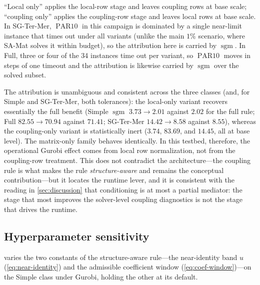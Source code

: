 \documentclass[AMA,Times1COL]{WileyNJDv5} %
\newcommand{\methodMat}{SA-Mat}
\newcommand{\sgm}{\ensuremath{\operatorname{sgm}}}
\newcommand{\PARten}{\ensuremath{\operatorname{PAR10}}}
\providecommand{\DIFadd}[1]{{\protect\color{blue} \sf #1}} %
\begin{document}
\begin{table}[t]
\begin{threeparttable}
\begin{tablenotes}[flushleft]\footnotesize
\item ``Local only'' applies the local-row stage and leaves coupling rows at base scale;
``coupling only'' applies the coupling-row stage and leaves local rows at base scale. In
SG-Ter-Mer, \PARten{} in this campaign is dominated by a single near-limit instance that
times out under all variants (unlike the main $1\%$ scenario, where \methodMat{} solves it
within budget), so the attribution here is carried by $\sgm$. In Full, three or four of the
34 instances time out per variant, so \PARten{} moves in steps of one timeout and the
attribution is likewise carried by $\sgm$ over the solved subset.
\end{tablenotes}
\end{threeparttable}
\end{table}

\DIFadd{The attribution is unambiguous and consistent across the three classes (and, for Simple and
SG-Ter-Mer, both tolerances): the
local-only variant recovers essentially the full benefit (Simple $\sgm$ $3.73\!\to\!2.01$
against $2.02$ for the full rule; Full $82.55\!\to\!70.94$ against $71.41$; SG-Ter-Mer
$14.42\!\to\!8.58$ against $8.55$), whereas the
coupling-only variant is statistically inert ($3.74$, $83.69$, and $14.45$, all at base
level). The matrix-only family behaves identically. In this testbed, therefore, the operational Gurobi
effect comes from local row normalization, not from the coupling-row treatment. This does
not contradict the architecture---the coupling rule is what makes the rule
\emph{structure-aware} and remains the conceptual contribution---but it locates the runtime
lever, and it is consistent with the reading in \cref{sec:discussion} that conditioning is
at most a partial mediator: the stage that most improves the solver-level coupling
diagnostics is not the stage that drives the runtime.
}

\subsection{\DIFadd{Hyperparameter sensitivity}}
\label{subsec:hyperparam-results}

\DIFadd{ varies the two constants of the structure-aware rule---the
near-identity band $u$ (\cref{eq:near-identity}) and the admissible coefficient window
(\cref{eq:coef-window})---on the Simple class under Gurobi, holding the other at its default.
}
\end{document}
